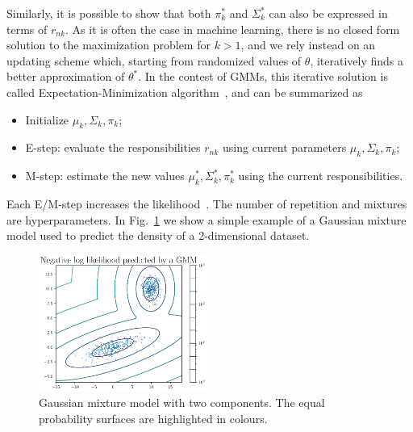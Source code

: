 %
Similarly, it is possible to show that both $\pi_k^{*}$ and $\Sigma_k^{*}$ can also be expressed in terms of $r_{nk}$. 
As it is often the case in machine learning, there is no closed form solution to the maximization problem for $k > 1$, and we rely instead on an updating scheme which, starting from randomized values of $\theta$, iteratively finds a better approximation of $\theta^{*}$.
In the contest of GMMs, this iterative solution is called Expectation-Minimization algorithm~\cite{ExpMin1}, and can be summarized as
%
\begin{itemize}
\item
Initialize $\mu_k, \Sigma_k, \pi_k$;
\item
E-step: evaluate the responsibilities $r_{nk}$ using current parameters $\mu_k, \Sigma_k, \pi_k$;
\item
M-step: estimate the new values $\mu_k^{*}, \Sigma_k^{*}, \pi_k^{*}$ using the current responsibilities.
\end{itemize}
Each E/M-step increases the likelihood~\cite{ExpMin2}. The number of repetition and mixtures are hyperparameters.
In Fig.~\ref{fig:gmm} we show a simple example of a Gaussian mixture model used to predict the density of a 2-dimensional dataset.
\begin{figure}[t]
\centering
\includegraphics[page = 1, width=0.49\textwidth]{./figures/gmm}
\caption{Gaussian mixture model with two components. The equal probability surfaces are highlighted in colours.}
\label{fig:gmm}
\end{figure}

